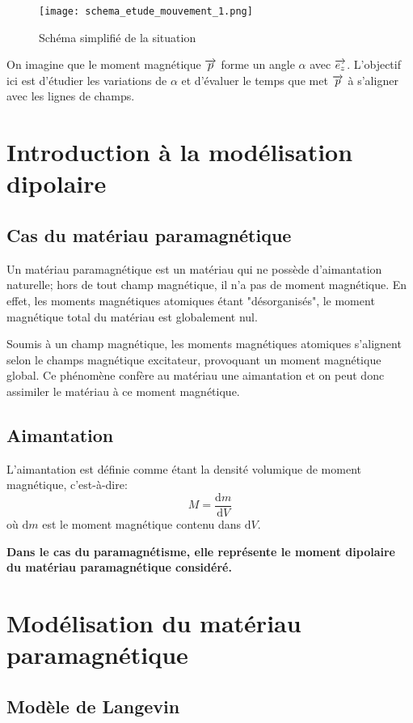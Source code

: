 \begin{figure}[h]
    \centering
    \texttt{[image: schema\_etude\_mouvement\_1.png]}
    \caption{Schéma simplifié de la situation}
\end{figure}  

On imagine que le moment magnétique $\overrightarrow{p}$ forme un angle $\alpha$ avec $\overrightarrow{e_z}$. L'objectif ici est d'étudier les variations de $\alpha$ et d'évaluer le temps que met $\overrightarrow{p}$ à s'aligner avec les lignes de champs.
\newpage

\section{Introduction à la modélisation dipolaire}
\subsection{Cas du matériau paramagnétique}
Un matériau paramagnétique est un matériau qui ne possède d'aimantation naturelle; hors de tout champ magnétique, il n'a pas de moment magnétique. En effet, les moments magnétiques atomiques étant "désorganisés", le moment magnétique total du matériau est globalement nul.

Soumis à un champ magnétique, les moments magnétiques atomiques s'alignent selon le champs magnétique excitateur, provoquant un moment magnétique global. Ce phénomène confère au matériau une aimantation et on peut donc assimiler le matériau à ce moment magnétique.

\subsection{Aimantation}
L'aimantation est définie comme étant la densité volumique de moment magnétique, c'est-à-dire: $$M = \frac{\mathrm{d}m}{\mathrm{d}V}$$
où $\mathrm{d}m$ est le moment magnétique contenu dans $\mathrm{d}V$.

\textbf{Dans le cas du paramagnétisme, elle représente le moment dipolaire du matériau paramagnétique considéré.}

\section{Modélisation du matériau paramagnétique}
\subsection{Modèle de Langevin}


